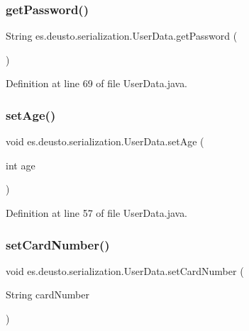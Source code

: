 \subsubsection{\texorpdfstring{get\+Password()}{getPassword()}}
{\footnotesize\ttfamily String es.\+deusto.\+serialization.\+User\+Data.\+get\+Password (\begin{DoxyParamCaption}{ }\end{DoxyParamCaption})}



Definition at line 69 of file User\+Data.\+java.

\mbox{\label{classes_1_1deusto_1_1serialization_1_1_user_data_a0d79539941068f8b01614c15516e2207}} 
\subsubsection{\texorpdfstring{set\+Age()}{setAge()}}
{\footnotesize\ttfamily void es.\+deusto.\+serialization.\+User\+Data.\+set\+Age (\begin{DoxyParamCaption}\item[{int}]{age }\end{DoxyParamCaption})}



Definition at line 57 of file User\+Data.\+java.

\mbox{\label{classes_1_1deusto_1_1serialization_1_1_user_data_a20d9f43c3a0007407a02463743c65d87}} 
\subsubsection{\texorpdfstring{set\+Card\+Number()}{setCardNumber()}}
{\footnotesize\ttfamily void es.\+deusto.\+serialization.\+User\+Data.\+set\+Card\+Number (\begin{DoxyParamCaption}\item[{String}]{card\+Number }\end{DoxyParamCaption})}




